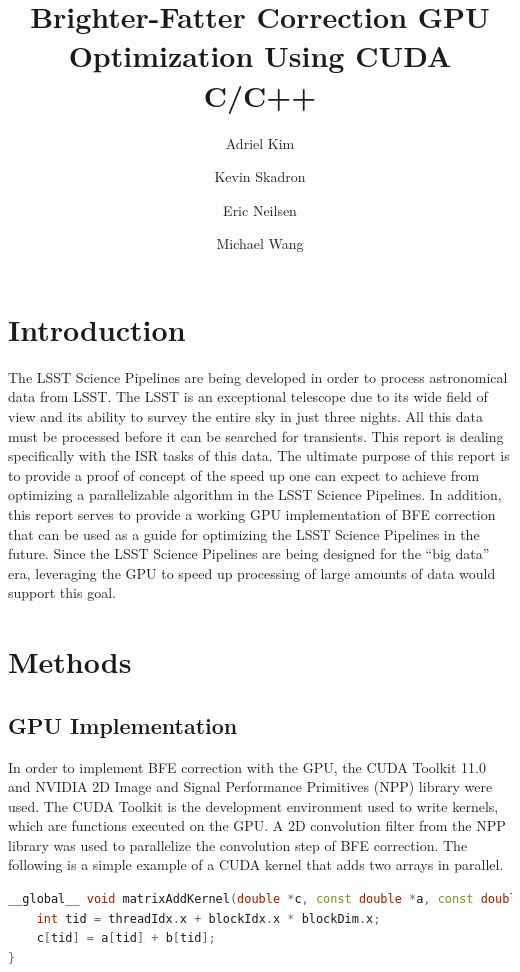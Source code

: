 \documentclass[DM,authoryear,toc]{lsstdoc}
\title{Brighter-Fatter Correction GPU Optimization Using CUDA C/C++}
\author[1]{Adriel Kim}
\author[1]{Kevin Skadron}
\author[2]{Eric Neilsen}
\author[2]{Michael Wang}
\affil[1]{University of Virginia, Charlottesville, VA 22904, USA}
\affil[2]{Fermi National Accelerator Laboratory, Batavia, IL 60510, USA}
\date{\vcsDate}
\begin{document}
\maketitle


\section{Introduction}

The LSST Science Pipelines are being developed in order to process astronomical data from LSST. The LSST is an exceptional telescope due to its wide field of view and its ability to survey the entire sky in just three nights. All this data must be processed before it can be searched for transients. This report is dealing specifically with the ISR tasks of this data. The ultimate purpose of this report is to provide a proof of concept of the speed up one can expect to achieve from optimizing a parallelizable algorithm in the LSST Science Pipelines. In addition, this report serves to provide a working GPU implementation of BFE correction that can be used as a guide for optimizing the LSST Science Pipelines in the future. Since the LSST Science Pipelines are being designed for the ``big data'' era, leveraging the GPU to speed up processing of large amounts of data would support this goal.

\section{Methods} 
\subsection{GPU Implementation}
In order to implement BFE correction with the GPU, the CUDA Toolkit 11.0 and NVIDIA 2D Image and Signal Performance Primitives (NPP) library were used. The CUDA Toolkit is the development environment used to write kernels, which are functions executed on the GPU. A 2D convolution filter from the NPP library was used to parallelize the convolution step of BFE correction. The following is a simple example of a CUDA kernel that adds two arrays in parallel.

\begin{lstlisting}[language=C++,basicstyle=\small,frame=single]
__global__ void matrixAddKernel(double *c, const double *a, const double *b) {
    int tid = threadIdx.x + blockIdx.x * blockDim.x;
    c[tid] = a[tid] + b[tid];
}
\end{lstlisting}
\end{document}

